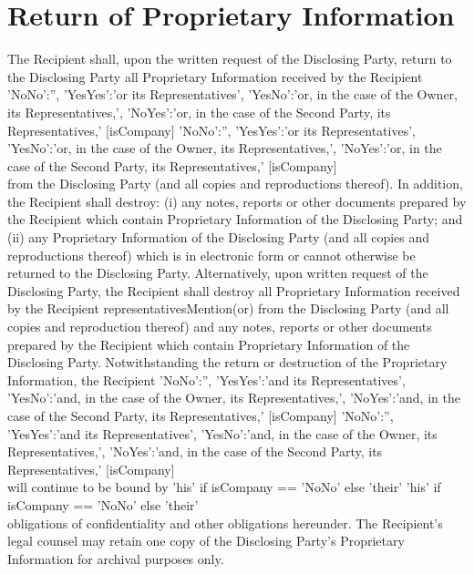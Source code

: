 \documentclass[8pt]{article}
\makeatletter
\edef\history{ }
\newcommand{\VAR}[1]{{\color{blue} #1}\g@addto@macro\history{#1\\}}
\newcommand{\representativesMention}[1]{
    \VAR{
        {
            'NoNo':'',
            'YesYes':'#1 its Representatives',
            'YesNo':'#1, in the case of the Owner, its Representatives,',
            'NoYes':'#1, in the case of the Second Party, its Representatives,'
        }[isCompany]
    }
}
\makeatother
\begin{document}
\section{Return of Proprietary Information}
The Recipient shall, upon the written request of the Disclosing Party, return to the Disclosing Party all Proprietary Information received by the Recipient \representativesMention{or} from the Disclosing Party (and all copies and reproductions thereof). In addition, the Recipient shall destroy:  (i) any notes, reports or other documents prepared by the Recipient which contain Proprietary Information of the Disclosing Party; and (ii) any Proprietary Information of the Disclosing Party (and all copies and reproductions thereof) which is in electronic form or cannot otherwise be returned to the Disclosing Party. Alternatively, upon written request of the Disclosing Party, the Recipient shall destroy all Proprietary Information received by the Recipient {representativesMention}(or) from the Disclosing Party (and all copies and reproduction thereof) and any notes, reports or other documents prepared by the Recipient which contain Proprietary Information of the Disclosing Party. Notwithstanding the return or destruction of the Proprietary
Information, the Recipient \representativesMention{and} will continue to be bound by
\VAR{  'his'  if isCompany == 'NoNo' else 'their' }
obligations  of confidentiality and other obligations hereunder.
The Recipient's legal counsel may retain one copy of the Disclosing Party's Proprietary Information for archival purposes only.
\end{document}
